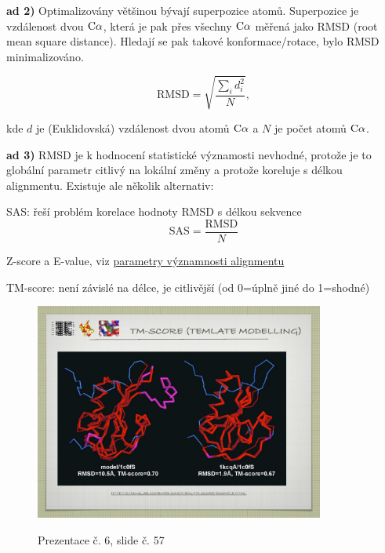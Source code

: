 \documentclass[DIV=8]{scrreprt}
\begin{document}
\textbf{ad 2)} Optimalizovány většinou bývají superpozice atomů. Superpozice je vzdálenost dvou \(\ce{C\alpha}\), která je pak přes všechny \(\ce{C\alpha}\) měřená jako RMSD (root mean square distance). Hledají se pak takové konformace/rotace, bylo RMSD minimalizováno.

\[\text{RMSD} = \sqrt{\frac{\sum_i d_i^2}{N}},\]

kde \(d\) je (Euklidovská) vzdálenost dvou atomů \(\ce{C\alpha}\) a \(N\) je počet atomů \(\ce{C\alpha}\).

\textbf{ad 3)} RMSD je k hodnocení statistické významosti nevhodné, protože je to globální parametr citlivý na lokální změny a protože koreluje s délkou alignmentu. Existuje ale několik alternativ:
\begin{myItemize}[nosep]
    \item SAS: řeší problém korelace hodnoty RMSD s délkou sekvence
  \[\text{SAS} = \frac{\text{RMSD}}{N}\]
    \item Z-score a E-value, viz \hyperref[Parametry významnosti alignmentu]{para­me­try výz­nam­nos­ti align­men­tu}
    \item TM-score: není závislé na délce, je citlivější (od 0=úplně jiné do 1=shodné) \begin{figure}
    \caption{Prezentace č. 6, slide č. 57}
    \includegraphics[width=0.85\textwidth]{slides-6/slide-57.jpg}
    \centering
    \label{slides-6-slide-57}
\end{figure}

\end{myItemize}
\end{document}
